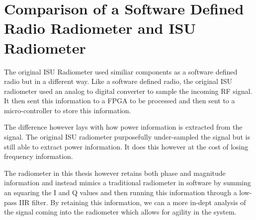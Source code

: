 \section{Comparison of a Software Defined Radio Radiometer and ISU Radiometer}

The original ISU Radiometer used similiar components as a software defined radio but in a different way.  Like a software defined radio, the original ISU radiometer used an analog to digital converter to sample the incoming RF signal.  It then sent this information to a FPGA to be processed and then sent to a micro-controller to store this information.  

The difference however lays with how power information is extracted from the signal.  The original ISU radiometer purposefully under-sampled the signal but is still able to extract power information.  It does this however at the cost of losing frequency information.  

The radiometer in this thesis however retains both phase and magnitude information and instead mimics a traditional radiometer in software by summing an squaring the I and Q values and then running this information through a low-pass IIR filter.  By retaining this information, we can a more in-dept analysis of the signal coming into the radiometer which allows for agility in the system.